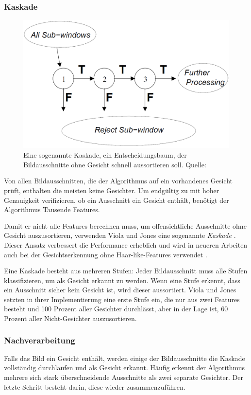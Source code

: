 \documentclass[doktyp=semarbeit, sprache=german]{TUBAFarbeiten}
\begin{document}
\subsubsection{Kaskade}
\begin{figure}
	\centering
	\includegraphics[width=0.7\linewidth]{images/cascade}
	\caption[Kaskade]{Eine sogenannte Kaskade, ein Entscheidungsbaum, der Bildausschnitte ohne Gesicht schnell aussortieren soll. Quelle: \cite{Viola01rapidobject}}
	\label{fig:cascade}
\end{figure}


Von allen Bildausschnitten, die der Algorithmus auf ein vorhandenes Gesicht prüft, enthalten die meisten keine Gesichter. Um endgültig zu mit hoher Genauigkeit verifizieren, ob ein Ausschnitt ein Gesicht enthält, benötigt der Algorithmus Tausende Features.

Damit er nicht alle Features berechnen muss, um offensichtliche Ausschnitte ohne Gesicht auszusortieren, verwenden Viola und Jones eine sogenannte \textit{Kaskade} \cite{Viola01rapidobject}. Dieser Ansatz verbessert die Performance erheblich und wird in neueren Arbeiten auch bei der Gesichtserkennung ohne Haar-like-Features verwendet \cite{Li_2015_CVPR}.

Eine Kaskade besteht aus mehreren Stufen: Jeder Bildausschnitt muss alle Stufen klassifizieren, um als Gesicht erkannt zu werden. Wenn eine Stufe erkennt, dass ein Ausschnitt sicher kein Gesicht ist, wird dieser aussortiert. Viola und Jones setzten in ihrer Implementierung eine erste Stufe ein, die nur aus zwei Features besteht und 100 Prozent aller Gesichter durchlässt, aber in der Lage ist, 60 Prozent aller Nicht-Gesichter auszusortieren.

\subsubsection{Nachverarbeitung}

Falls das Bild ein Gesicht enthält, werden einige der Bildausschnitte die Kaskade vollständig durchlaufen und als Gesicht erkannt. Häufig erkennt der Algorithmus mehrere sich stark überschneidende Ausschnitte als zwei separate Gesichter. Der letzte Schritt besteht darin, diese wieder zusammenzuführen.
\end{document}
